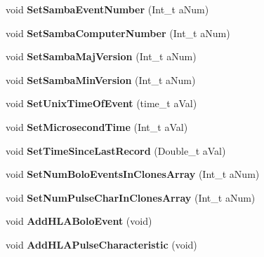 \begin{DoxyCompactItemize}
\item 
\hypertarget{class_edw_h_l_a_bolo_record_a7e6ebac6780aa80b3629a15a5ad9c771}{
void {\bfseries SetSambaEventNumber} (Int\_\-t aNum)}
\label{class_edw_h_l_a_bolo_record_a7e6ebac6780aa80b3629a15a5ad9c771}

\item 
\hypertarget{class_edw_h_l_a_bolo_record_a6ef6426bd28fd7e729463db69f8c0a2d}{
void {\bfseries SetSambaComputerNumber} (Int\_\-t aNum)}
\label{class_edw_h_l_a_bolo_record_a6ef6426bd28fd7e729463db69f8c0a2d}

\item 
\hypertarget{class_edw_h_l_a_bolo_record_aa92dde5ba858574db8a431d4ab3b1bee}{
void {\bfseries SetSambaMajVersion} (Int\_\-t aNum)}
\label{class_edw_h_l_a_bolo_record_aa92dde5ba858574db8a431d4ab3b1bee}

\item 
\hypertarget{class_edw_h_l_a_bolo_record_a12951e4b5f2c325d7de954ef7c6a7127}{
void {\bfseries SetSambaMinVersion} (Int\_\-t aNum)}
\label{class_edw_h_l_a_bolo_record_a12951e4b5f2c325d7de954ef7c6a7127}

\item 
\hypertarget{class_edw_h_l_a_bolo_record_a1bc8dcc837d1117d7d1b9e392a2b3fd8}{
void {\bfseries SetUnixTimeOfEvent} (time\_\-t aVal)}
\label{class_edw_h_l_a_bolo_record_a1bc8dcc837d1117d7d1b9e392a2b3fd8}

\item 
\hypertarget{class_edw_h_l_a_bolo_record_a9cdeab04a62a0b3d451d7a7496b6661d}{
void {\bfseries SetMicrosecondTime} (Int\_\-t aVal)}
\label{class_edw_h_l_a_bolo_record_a9cdeab04a62a0b3d451d7a7496b6661d}

\item 
\hypertarget{class_edw_h_l_a_bolo_record_a7900a38968cfb26ad3b5a401ee9f719f}{
void {\bfseries SetTimeSinceLastRecord} (Double\_\-t aVal)}
\label{class_edw_h_l_a_bolo_record_a7900a38968cfb26ad3b5a401ee9f719f}

\item 
\hypertarget{class_edw_h_l_a_bolo_record_aa90a0a773a7e224741b35908faadaf8d}{
void {\bfseries SetNumBoloEventsInClonesArray} (Int\_\-t aNum)}
\label{class_edw_h_l_a_bolo_record_aa90a0a773a7e224741b35908faadaf8d}

\item 
\hypertarget{class_edw_h_l_a_bolo_record_a5bf631e319228f11bc40aa2b29272214}{
void {\bfseries SetNumPulseCharInClonesArray} (Int\_\-t aNum)}
\label{class_edw_h_l_a_bolo_record_a5bf631e319228f11bc40aa2b29272214}

\item 
\hypertarget{class_edw_h_l_a_bolo_record_a8b2191cfdd5e3e199e7b4ca2815a6916}{
void {\bfseries AddHLABoloEvent} (void)}
\label{class_edw_h_l_a_bolo_record_a8b2191cfdd5e3e199e7b4ca2815a6916}

\item 
\hypertarget{class_edw_h_l_a_bolo_record_a3f3c4c90e6ead18c3015a0e183aa009c}{
void {\bfseries AddHLAPulseCharacteristic} (void)}
\label{class_edw_h_l_a_bolo_record_a3f3c4c90e6ead18c3015a0e183aa009c}

\end{DoxyCompactItemize}


